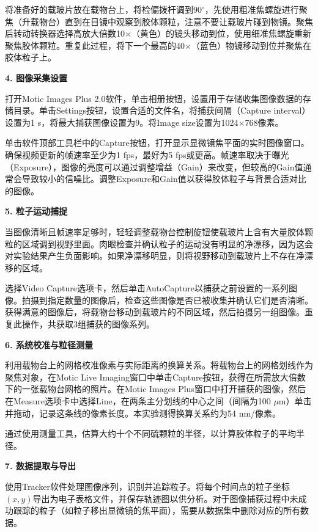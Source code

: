 \documentclass[a4paper]{article}
\begin{document}
将准备好的载玻片放在载物台上，将检偏拨杆调到90$^\circ$，先使用粗准焦螺旋进行聚焦（升载物台）直到在目镜中观察到胶体颗粒，注意不要让载玻片碰到物镜。聚焦后转动转换器选择高放大倍数10$\times$（黄色）的镜头移动到位，使用细准焦螺旋重新聚焦胶体颗粒。重复此过程，将下一个最高的40$\times$（蓝色）物镜移动到位并聚焦在胶体粒子上。

\textbf{4. 图像采集设置}

打开Motic Images Plus 2.0软件，单击相册按钮，设置用于存储收集图像数据的存储目录。单击Settings按钮，设置合适的文件名，将捕获间隔（Capture interval）设置为1 s，将最大捕获图像设置为9。将Image size设置为1024$\times$768像素。

单击软件顶部工具栏中的Capture按钮，打开显示显微镜焦平面的实时图像窗口。确保视频更新的帧速率至少为1 fps，最好为5 fps或更高。帧速率取决于曝光（Exposure），图像的亮度可以通过调整增益（Gain）来改变，但较高的Gain值通常会导致较小的信噪比。调整Exposure和Gain值以获得胶体粒子与背景合适对比的图像。

\textbf{5. 粒子运动捕捉}

当图像清晰且帧速率足够时，轻轻调整载物台控制旋钮使载玻片上含有大量胶体颗粒的区域调到视野里面。肉眼检查并确认粒子的运动没有明显的净漂移，因为这会对实验结果产生负面影响。如果净漂移明显，则将视野移动到载玻片上不存在净漂移的区域。

选择Video Capture选项卡，然后单击AutoCapture以捕获之前设置的一系列图像。拍摄到指定数量的图像后，检查这些图像是否已被收集并确认它们是否清晰。获得满意的图像后，将载物台移动到载玻片的不同区域，然后拍摄另一组图像。重复此操作，共获取3组捕获的图像系列。

\textbf{6. 系统校准与粒径测量}

利用载物台上的网格校准像素与实际距离的换算关系。将载物台上的网格划线作为聚焦对象，在Motic Live Imaging窗口中单击Capture按钮，获得在所需放大倍数下的一张载物台网格的照片。在Motic Images Plus窗口中打开捕获的图像，然后在Measure选项卡中选择Line，在两条主分划线的中心之间（间隔为100 $\mu$m）单击并拖动，记录这条线的像素长度。本实验测得换算关系约为54 nm/像素。

通过使用测量工具，估算大约十个不同硫颗粒的半径，以计算胶体粒子的平均半径。

\textbf{7. 数据提取与导出}

使用Tracker软件处理图像序列，识别并追踪粒子。将每个时间点的粒子坐标$(x, y)$导出为电子表格文件，并保存轨迹图以供分析。对于图像捕获过程中未成功跟踪的粒子（如粒子移出显微镜的焦平面），需要从数据集中删除对应的所有数据。

\end{document}
